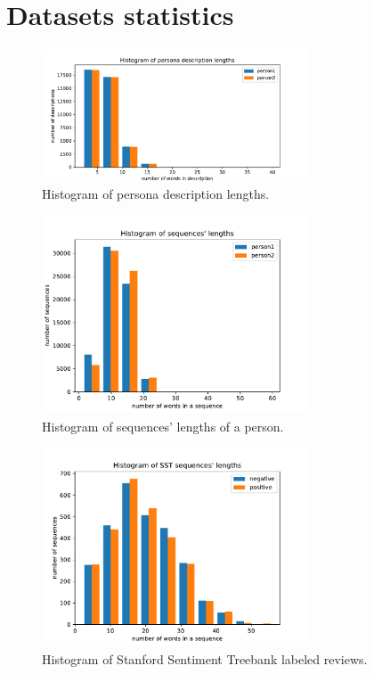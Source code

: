 \chapter{Datasets statistics}

\begin{figure}[hbt]
  \centering
  \includegraphics[width=0.7\textwidth]{figures/persona_desc.pdf}
  \caption{Histogram of persona description lengths.}
  \label{fig:histogram_persona_desc}
\end{figure}

\begin{figure}[hbt]
  \centering
  \includegraphics[width=0.7\textwidth]{figures/uttr_length.pdf}
  \caption{Histogram of sequences' lengths of a person.}
  \label{fig:histogram_uttr_length}
\end{figure}

\begin{figure}
  \centering
  \includegraphics[width=0.7\textwidth]{figures/sst.pdf}
  \caption{Histogram of Stanford Sentiment Treebank labeled reviews.}
  \label{fig:sst}
\end{figure}

